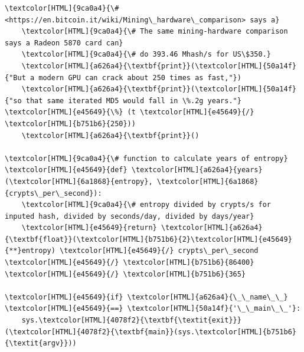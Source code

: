\documentclass{scrartcl}
\begin{document}
\begin{Code}
\begin{Verbatim}[]
    \textcolor[HTML]{9ca0a4}{\# <https://en.bitcoin.it/wiki/Mining\_hardware\_comparison> says a}
    \textcolor[HTML]{9ca0a4}{\# The same mining-hardware comparison says a Radeon 5870 card can}
    \textcolor[HTML]{9ca0a4}{\# do 393.46 Mhash/s for US\$350.}
    \textcolor[HTML]{a626a4}{\textbf{print}}(\textcolor[HTML]{50a14f}{"But a modern GPU can crack about 250 times as fast,"})
    \textcolor[HTML]{a626a4}{\textbf{print}}(\textcolor[HTML]{50a14f}{"so that same iterated MD5 would fall in \%.2g years."} \textcolor[HTML]{e45649}{\%} (t \textcolor[HTML]{e45649}{/} \textcolor[HTML]{b751b6}{250}))
    \textcolor[HTML]{a626a4}{\textbf{print}}()

\textcolor[HTML]{9ca0a4}{\# function to calculate years of entropy}
\textcolor[HTML]{e45649}{def} \textcolor[HTML]{a626a4}{years}(\textcolor[HTML]{6a1868}{entropy}, \textcolor[HTML]{6a1868}{crypts\_per\_second}):
    \textcolor[HTML]{9ca0a4}{\# entropy divided by crypts/s for inputed hash, divided by seconds/day, divided by days/year}
    \textcolor[HTML]{e45649}{return} \textcolor[HTML]{a626a4}{\textbf{float}}(\textcolor[HTML]{b751b6}{2}\textcolor[HTML]{e45649}{**}entropy) \textcolor[HTML]{e45649}{/} crypts\_per\_second \textcolor[HTML]{e45649}{/} \textcolor[HTML]{b751b6}{86400} \textcolor[HTML]{e45649}{/} \textcolor[HTML]{b751b6}{365}

\textcolor[HTML]{e45649}{if} \textcolor[HTML]{a626a4}{\_\_name\_\_} \textcolor[HTML]{e45649}{==} \textcolor[HTML]{50a14f}{'\_\_main\_\_'}:
    sys.\textcolor[HTML]{4078f2}{\textbf{\textit{exit}}}(\textcolor[HTML]{4078f2}{\textbf{main}}(sys.\textcolor[HTML]{b751b6}{\textit{argv}}))

\end{Verbatim}
\end{Code}
\end{document}

